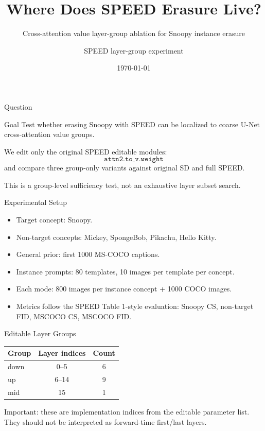 \documentclass[aspectratio=169,11pt]{beamer}
\title[Layer-wise SPEED Ablation]{Where Does SPEED Erasure Live?}
\subtitle{Cross-attention value layer-group ablation for Snoopy instance erasure}
\author{SPEED layer-group experiment}
\date{\today}
\begin{document}
\begin{frame}
  \titlepage
\end{frame}

\begin{frame}{Question}
  \begin{block}{Goal}
    Test whether erasing Snoopy with SPEED can be localized to coarse U-Net cross-attention value groups.
  \end{block}

  \vspace{0.5em}
  We edit only the original SPEED editable modules:
  \[
    \texttt{attn2.to\_v.weight}
  \]
  and compare three group-only variants against original SD and full SPEED.

  \vspace{0.5em}
  This is a group-level sufficiency test, not an exhaustive layer subset search.
\end{frame}

\begin{frame}{Experimental Setup}
  \begin{itemize}
    \item Target concept: Snoopy.
    \item Non-target concepts: Mickey, SpongeBob, Pikachu, Hello Kitty.
    \item General prior: first 1000 MS-COCO captions.
    \item Instance prompts: 80 templates, 10 images per template per concept.
    \item Each mode: 800 images per instance concept + 1000 COCO images.
    \item Metrics follow the SPEED Table 1-style evaluation:
      Snoopy CS, non-target FID, MSCOCO CS, MSCOCO FID.
  \end{itemize}
\end{frame}

\begin{frame}{Editable Layer Groups}
  \begin{table}
    \centering
    \begin{tabular}{lcc}
      \toprule
      Group & Layer indices & Count \\
      \midrule
      down & 0--5 & 6 \\
      up & 6--14 & 9 \\
      mid & 15 & 1 \\
      \bottomrule
    \end{tabular}
  \end{table}

  \vspace{0.8em}
  Important: these are implementation indices from the editable parameter list.
  They should not be interpreted as forward-time first/last layers.
\end{frame}
\end{document}
